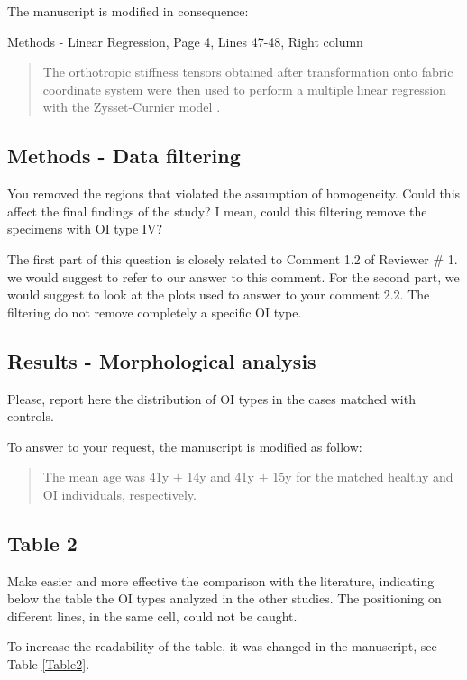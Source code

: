 \documentclass{AR2RC}
\begin{document}
\AR The manuscript is modified in consequence:\par

Methods - Linear Regression, Page 4, Lines 47-48, Right column
\begin{quote}
	The orthotropic stiffness tensors obtained after transformation onto fabric coordinate system were then used to perform a multiple linear regression with the Zysset-Curnier model .
\end{quote}

\subsection{Methods - Data filtering}
\RC You removed the regions that violated the assumption of homogeneity. Could this affect the final findings of the study? I mean, could this filtering remove the specimens with OI type IV?

\AR The first part of this question is closely related to Comment 1.2 of Reviewer \# 1. we would suggest to refer to our answer to this comment. For the second part, we would suggest to look at the plots used to answer to your comment 2.2. The filtering do not remove completely a specific OI type.

\subsection{Results - Morphological analysis}
\RC Please, report here the distribution of OI types in the cases matched with controls.

\AR To answer to your request, the manuscript is modified as follow:
\begin{quote}
	The mean age was 41y $\pm$ 14y and 41y $\pm$ 15y for the matched healthy and OI individuals, respectively. 
\end{quote}


\subsection{Table 2}
\RC Make easier and more effective the comparison with the literature, indicating below the table the OI types analyzed in the other studies. The positioning on different lines, in the same cell, could not be caught.

\AR To increase the readability of the table, it was changed in the manuscript, see Table \ref{Table2}.
\end{document}
